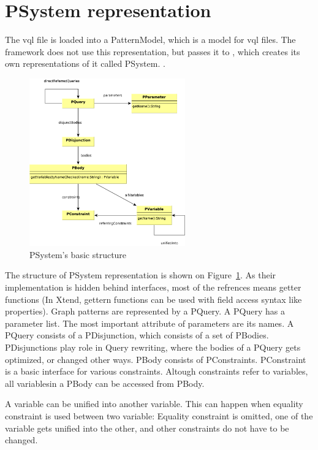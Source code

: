 \section{PSystem representation}


The vql file is loaded into a PatternModel, which is a model for vql files. 
The framework does not use this representation, but passes it to \viatra, which creates its own representations of it called PSystem. \cite{psystem}. 


\begin{figure}[H]
	\begin{center}
		\includegraphics[width=0.6\textwidth]{figures/psystem.pdf}
		\caption{PSystem's basic structure}
		\label{fig:psystem}
	\end{center}
\end{figure}

The structure of PSystem representation is shown on Figure~\ref{fig:psystem}. 
As their implementation is hidden behind interfaces, most of the refrences means getter functions (In Xtend, gettern functions can be used with field access syntax like \csharp{} properties). 
Graph patterns are represented by a PQuery. 
A PQuery has a parameter list. 
The most important attribute of parameters are its names. 
A PQuery consists of a PDisjunction, which consists of a set of PBodies. 
PDisjunctions play role in Query rewriting, where the bodies of a PQuery gets optimized, or changed other ways.
PBody consists of PConstraints. 
PConstraint is a basic interface for various constraints. 
Altough constraints refer to variables, all variablesin a PBody can be accessed from PBody.

A variable can be unified into another variable. 
This can happen when equality constraint is used between two variable: 
Equality constraint is omitted, one of the variable gets unified into the other, and other constraints do not have to be changed.



